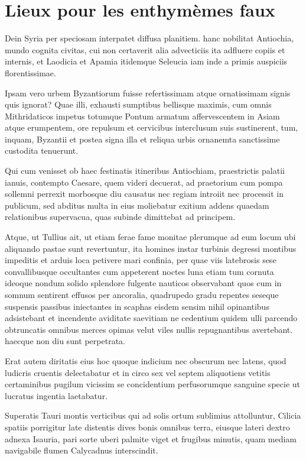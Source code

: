 
\section{Lieux pour les enthymèmes faux}

Dein Syria per speciosam interpatet diffusa planitiem. hanc nobilitat Antiochia, mundo cognita civitas, cui non certaverit alia 
advecticiis ita adfluere copiis et internis, et Laodicia et Apamia itidemque Seleucia iam inde a primis auspiciis florentissimae.

Ipsam vero urbem Byzantiorum fuisse refertissimam atque ornatissimam signis quis ignorat? Quae illi, exhausti sumptibus bellisque 
maximis, cum omnis Mithridaticos impetus totumque Pontum armatum affervescentem in Asiam atque erumpentem, ore repulsum 
et cervicibus interclusum suis sustinerent, tum, inquam, Byzantii et postea signa illa et reliqua urbis ornanemta sanctissime 
custodita tenuerunt.

Qui cum venisset ob haec festinatis itineribus Antiochiam, praestrictis palatii ianuis, contempto Caesare, quem videri decuerat, ad 
praetorium cum pompa sollemni perrexit morbosque diu causatus nec regiam introiit nec processit in publicum, sed abditus multa in 
eius moliebatur exitium addens quaedam relationibus supervacua, quas subinde dimittebat ad principem.

Atque, ut Tullius ait, ut etiam ferae fame monitae plerumque ad eum locum ubi aliquando pastae sunt revertuntur, ita homines 
instar turbinis degressi montibus impeditis et arduis loca petivere mari confinia, per quae viis latebrosis sese convallibusque 
occultantes cum appeterent noctes luna etiam tum cornuta ideoque nondum solido splendore fulgente nauticos observabant quos 
cum in somnum sentirent effusos per ancoralia, quadrupedo gradu repentes seseque suspensis passibus iniectantes in scaphas 
eisdem sensim nihil opinantibus adsistebant et incendente aviditate saevitiam ne cedentium quidem ulli parcendo obtruncatis 
omnibus merces opimas velut viles nullis repugnantibus avertebant. haecque non diu sunt perpetrata.

Erat autem diritatis eius hoc quoque indicium nec obscurum nec latens, quod ludicris cruentis delectabatur et in circo sex vel 
septem aliquotiens vetitis certaminibus pugilum vicissim se concidentium perfusorumque sanguine specie ut lucratus ingentia 
laetabatur.

Superatis Tauri montis verticibus qui ad solis ortum sublimius attolluntur, Cilicia spatiis porrigitur late distentis dives bonis omnibus 
terra, eiusque lateri dextro adnexa Isauria, pari sorte uberi palmite viget et frugibus minutis, quam mediam navigabile flumen 
Calycadnus interscindit.

